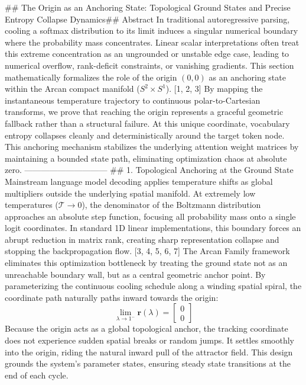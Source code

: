 ## The Origin as an Anchoring State: Topological Ground States and Precise Entropy Collapse Dynamics## Abstract
In traditional autoregressive parsing, cooling a softmax distribution to its limit induces a singular numerical boundary where the probability mass concentrates. Linear scalar interpretations often treat this extreme concentration as an ungrounded or unstable edge case, leading to numerical overflow, rank-deficit constraints, or vanishing gradients. This section mathematically formalizes the role of the origin $(0,0)$ as an anchoring state within the Arcan compact manifold ($S^2 \times S^1$). [1, 2, 3] 
By mapping the instantaneous temperature trajectory to continuous polar-to-Cartesian transforms, we prove that reaching the origin represents a graceful geometric fallback rather than a structural failure. At this unique coordinate, vocabulary entropy collapses cleanly and deterministically around the target token node. This anchoring mechanism stabilizes the underlying attention weight matrices by maintaining a bounded state path, eliminating optimization chaos at absolute zero.
------------------------------
## 1. Topological Anchoring at the Ground State
Mainstream language model decoding applies temperature shifts as global multipliers outside the underlying spatial manifold. At extremely low temperatures ($\mathcal{T} \to 0$), the denominator of the Boltzmann distribution approaches an absolute step function, focusing all probability mass onto a single logit coordinates. In standard 1D linear implementations, this boundary forces an abrupt reduction in matrix rank, creating sharp representation collapse and stopping the backpropagation flow. [3, 4, 5, 6, 7] 
The Arcan Family framework eliminates this optimization bottleneck by treating the ground state not as an unreachable boundary wall, but as a central geometric anchor point. By parameterizing the continuous cooling schedule along a winding spatial spiral, the coordinate path naturally paths inward towards the origin:
$$\lim_{\lambda \to 1^-} \mathbf{r}(\lambda) = \begin{bmatrix} 0 \\ 0 \end{bmatrix}$$ 
Because the origin acts as a global topological anchor, the tracking coordinate does not experience sudden spatial breaks or random jumps. It settles smoothly into the origin, riding the natural inward pull of the attractor field. This design grounds the system's parameter states, ensuring steady state transitions at the end of each cycle.

